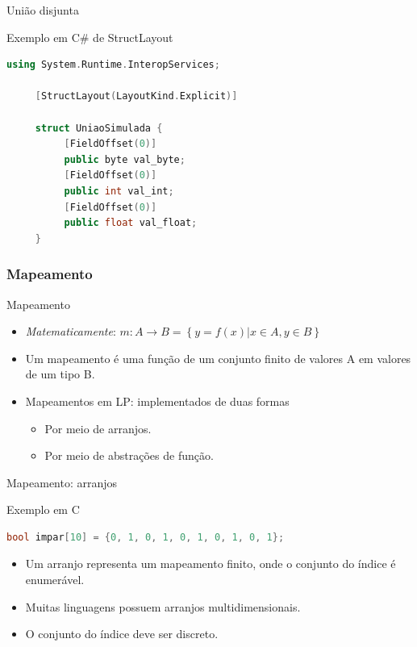 \documentclass[handout]{beamer}
\begin{document}
\begin{frame}[fragile]{União disjunta}

\begin{block}{Exemplo em C\# de StructLayout }
	\begin{lstlisting}[language=c++,numbers=none]
     using System.Runtime.InteropServices;

     [StructLayout(LayoutKind.Explicit)]

     struct UniaoSimulada {
          [FieldOffset(0)]
          public byte val_byte;
          [FieldOffset(0)]
          public int val_int;
          [FieldOffset(0)]
          public float val_float;
     }
	\end{lstlisting}
\end{block}

\end{frame}



\subsubsection{Mapeamento}

\begin{frame}[fragile]{Mapeamento}

\begin{itemize}
   \item \textit{Matematicamente}: $m: A \rightarrow B = \left\{ y = f(x) | x \in A, y \in B \right\}$
	 \item Um mapeamento é uma função de um conjunto finito de valores A em valores de um tipo B.
   \item Mapeamentos em LP: implementados de duas formas
   \begin{itemize}
       \item Por meio de arranjos.
       \item Por meio de abstrações de função.
   \end{itemize}
\end{itemize}
\end{frame}


\begin{frame}[fragile]{Mapeamento: arranjos}


\begin{block}{Exemplo em C}
	\begin{lstlisting}[language=c,numbers=none]
     bool impar[10] = {0, 1, 0, 1, 0, 1, 0, 1, 0, 1};
  \end{lstlisting}
\end{block}
  \begin{itemize}
		\item Um arranjo representa um  mapeamento finito, onde o conjunto do índice é enumerável.
		\item Muitas linguagens possuem arranjos multidimensionais.
		\item O conjunto do índice deve ser discreto.
  \end{itemize}
\end{frame}
\end{document}

